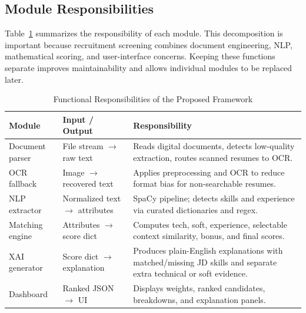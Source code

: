 \subsection{Module Responsibilities}
Table~\ref{tab:modules} summarizes the responsibility of each module. This decomposition is important because recruitment screening combines document engineering, NLP, mathematical scoring, and user-interface concerns. Keeping these functions separate improves maintainability and allows individual modules to be replaced later.

\begin{table}[!ht]
\centering
\small
\begin{tabular}{|p{}|p{}|p{}|}
\hline
\rowcolor{gray!25}
\textbf{Module} & \textbf{Input / Output} & \textbf{Responsibility}\\
\hline
Document parser & File stream $\rightarrow$ raw text & Reads digital documents, detects low-quality extraction, routes scanned resumes to OCR.\\
\hline
OCR fallback & Image $\rightarrow$ recovered text & Applies preprocessing and OCR to reduce format bias for non-searchable resumes.\\
\hline
NLP extractor & Normalized text $\rightarrow$ attributes & SpaCy pipeline; detects skills and experience via curated dictionaries and regex.\\
\hline
Matching engine & Attributes $\rightarrow$ score dict & Computes tech, soft, experience, selectable context similarity, bonus, and final scores.\\
\hline
XAI generator & Score dict $\rightarrow$ explanation & Produces plain-English explanations with matched/missing JD skills and separate extra technical or soft evidence.\\
\hline
Dashboard & Ranked JSON $\rightarrow$ UI & Displays weights, ranked candidates, breakdowns, and explanation panels.\\
\hline
\end{tabular}
\caption{Functional Responsibilities of the Proposed Framework}
\label{tab:modules}
\end{table}
